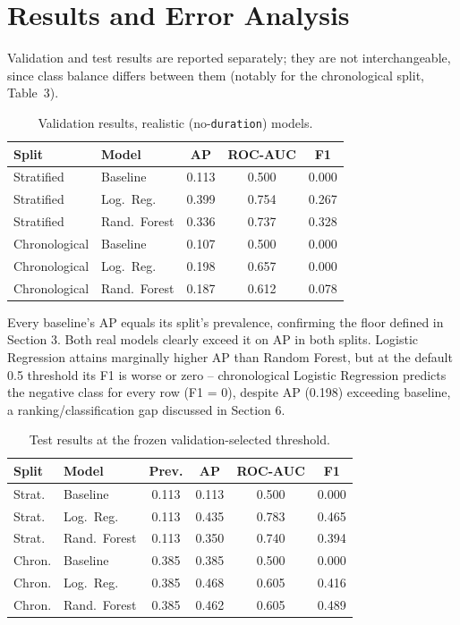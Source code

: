 \documentclass{article}
\begin{document}
\section{Results and Error Analysis}
Validation and test results are reported separately; they are not
interchangeable, since class balance differs between them (notably for the
chronological split, Table~3).

\begin{table}[ht]
\centering
\footnotesize
\caption{Validation results, realistic (no-\texttt{duration}) models.}
\begin{tabular}{llccc}
\toprule
Split & Model & AP & ROC-AUC & F1 \\
\midrule
Stratified & Baseline & 0.113 & 0.500 & 0.000 \\
Stratified & Log.\ Reg. & 0.399 & 0.754 & 0.267 \\
Stratified & Rand.\ Forest & 0.336 & 0.737 & 0.328 \\
Chronological & Baseline & 0.107 & 0.500 & 0.000 \\
Chronological & Log.\ Reg. & 0.198 & 0.657 & 0.000 \\
Chronological & Rand.\ Forest & 0.187 & 0.612 & 0.078 \\
\bottomrule
\end{tabular}
\end{table}

Every baseline's AP equals its split's prevalence, confirming the floor
defined in Section 3. Both real models clearly exceed it on AP in both
splits. Logistic Regression attains marginally higher AP than Random
Forest, but at the default 0.5 threshold its F1 is worse or zero --
chronological Logistic Regression predicts the negative class for every row
(F1 = 0), despite AP (0.198) exceeding baseline, a ranking/classification
gap discussed in Section 6.

\begin{table}[ht]
\centering
\footnotesize
\caption{Test results at the frozen validation-selected threshold.}
\begin{tabular}{llcccc}
\toprule
Split & Model & Prev. & AP & ROC-AUC & F1 \\
\midrule
Strat. & Baseline & 0.113 & 0.113 & 0.500 & 0.000 \\
Strat. & Log.\ Reg. & 0.113 & 0.435 & 0.783 & 0.465 \\
Strat. & Rand.\ Forest & 0.113 & 0.350 & 0.740 & 0.394 \\
Chron. & Baseline & 0.385 & 0.385 & 0.500 & 0.000 \\
Chron. & Log.\ Reg. & 0.385 & 0.468 & 0.605 & 0.416 \\
Chron. & Rand.\ Forest & 0.385 & 0.462 & 0.605 & 0.489 \\
\bottomrule
\end{tabular}
\end{table}
\end{document}
